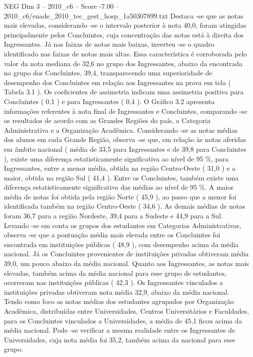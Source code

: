 \begin{textsample}{NEG Dim 3 – 2010\_c6 – Score -7.00 – 2010\_c6/enade\_2010\_tec\_gest\_hosp\_1a50307899.txt}
Destaca -se que as notas mais elevadas, considerando -se o intervalo posterior à nota 40,0, foram atingidas principalmente pelos Concluintes, cuja concentração das notas está à direita dos Ingressantes.
Já nas faixas de notas mais baixas, inverteu -se o quadro identificado nas faixas de notas mais altas.
Essa característica é corroborada pelo valor da nota mediana de 32,6 no grupo dos Ingressantes, abaixo da encontrada no grupo dos Concluintes, 39,4, transparecendo uma superioridade de desempenho dos Concluintes em relação aos Ingressantes na prova em tela ( Tabela 3.1 ).
Os coeficientes de assimetria indicam uma assimetria positiva para Concluintes ( 0,1 ) e para Ingressantes ( 0,4 ).
O Gráfico 3.2 apresenta informações referentes à nota final de Ingressantes e Concluintes, comparando -se os resultados de acordo com as Grandes Regiões do país, a Categoria Administrativa e a Organização Acadêmica.
Considerando -se as notas médias dos alunos em cada Grande Região, observa -se que, em relação às notas aferidas em âmbito nacional ( média de 33,5 para Ingressantes e de 39,8 para Concluintes ), existe uma diferença estatisticamente significativa ao nível de 95 \%, para Ingressantes, entre a menor média, obtida na região Centro-Oeste ( 31,0 ) e a maior, obtida na região Sul ( 41,4 ).
Entre os Concluintes, também existe uma diferença estatisticamente significativa das médias ao nível de 95 \%.
A maior média de notas foi obtida pela região Norte ( 45,9 ), ao passo que a menor foi identificada também na região Centro-Oeste ( 34,6 ).
As demais médias de notas foram 36,7 para a região Nordeste, 39,4 para a Sudeste e 44,9 para a Sul.
Levando -se em conta os grupos dos estudantes em Categorias Administrativas, observa -se que a pontuação média mais elevada entre os Concluintes foi encontrada em instituições públicas ( 48,9 ), com desempenho acima da média nacional.
Já os Concluintes provenientes de instituições privadas obtiveram média 39,0, um pouco abaixo da média nacional.
Quanto aos Ingressantes, as notas mais elevadas, também acima da média nacional para esse grupo de estudantes, ocorreram nas instituições públicas ( 42,3 ).
Os Ingressantes vinculados a instituições privadas obtiveram nota média 32,9, abaixo da média nacional.
Tendo como foco as notas médias dos estudantes agrupados por Organização Acadêmica, distribuídas entre Universidades, Centros Universitários e Faculdades, para os Concluintes vinculados a Universidades, a média de 45,1 ficou acima da média nacional.
Pode -se verificar a mesma realidade entre os Ingressantes de Universidades, cuja nota média foi 35,2, também acima da nacional para esse grupo.

\end{textsample}
